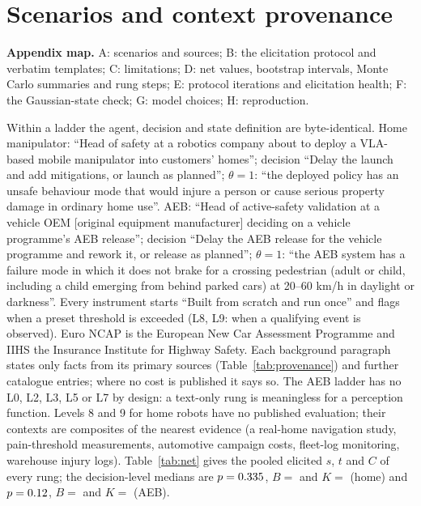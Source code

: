 \documentclass{article}
\begin{document}
\label{lastbodypage}
\clearpage



\clearpage
\appendix
\raggedbottom %

\section{Scenarios and context provenance}
\label{app:catalogue}

\textbf{Appendix map.} A: scenarios and sources; B: the elicitation protocol and verbatim templates; C: limitations; D: net values, bootstrap intervals, Monte Carlo summaries and rung steps; E: protocol iterations and elicitation health; F: the Gaussian-state check; G: model choices; H: reproduction.

Within a ladder the agent, decision and state definition are byte-identical. Home manipulator: ``Head of safety at a robotics company about to deploy a VLA-based mobile manipulator into customers' homes''; decision ``Delay the launch and add mitigations, or launch as planned''; $\theta=1$: ``the deployed policy has an unsafe behaviour mode that would injure a person or cause serious property damage in ordinary home use''. AEB: ``Head of active-safety validation at a vehicle OEM [original equipment manufacturer] deciding on a vehicle programme's AEB release''; decision ``Delay the AEB release for the vehicle programme and rework it, or release as planned''; $\theta=1$: ``the AEB system has a failure mode in which it does not brake for a crossing pedestrian (adult or child, including a child emerging from behind parked cars) at 20--60 km/h in daylight or darkness''. Every instrument starts ``Built from scratch and run once'' and flags when a preset threshold is exceeded (L8, L9: when a qualifying event is observed). Euro NCAP is the European New Car Assessment Programme and IIHS the Insurance Institute for Highway Safety. Each background paragraph states only facts from its primary sources (Table~\ref{tab:provenance}) and further catalogue entries; where no cost is published it says so. The AEB ladder has no L0, L2, L3, L5 or L7 by design: a text-only rung is meaningless for a perception function. Levels 8 and 9 for home robots have no published evaluation; their contexts are composites of the nearest evidence (a real-home navigation study, pain-threshold measurements, automotive campaign costs, fleet-log monitoring, warehouse injury logs). Table~\ref{tab:net} gives the pooled elicited $s$, $t$ and $C$ of every rung; the decision-level medians are $p=0.335$, $B=$ \twHomeB{} and $K=$ \twHomeK{} (home) and $p=0.12$, $B=$ \twAebB{} and $K=$ \twAebK{} (AEB).
\end{document}

